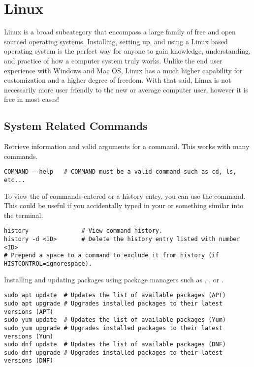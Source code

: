 \chapter{Linux}
\thispagestyle{fancy}
\lstset{language=Bash, style=terminalstyle}

Linux is a broad subcategory that encompass a large family of free and open sourced operating systems. Installing, setting up, and using a Linux based operating system is the perfect way for anyone to gain knowledge, understanding, and practice of how a computer system truly works. Unlike the end user experience with Windows and Mac OS, Linux has a much higher capability for customization and a higher degree of freedom. With that said, Linux is not necessarily more user friendly to the new or average computer user, however it is free in most cases!








\section{System Related Commands}

Retrieve information and valid arguments for a command. This works with many commands.
\begin{lstlisting}
COMMAND --help   # COMMAND must be a valid command such as cd, ls, etc...
\end{lstlisting}

To view the  of commands entered or  a history entry, you can use the  command. This could be useful if you accidentally typed in your  or something similar into the terminal.
\begin{lstlisting}
history               # View command history.
history -d <ID>       # Delete the history entry listed with number <ID>
# Prepend a space to a command to exclude it from history (if HISTCONTROL=ignorespace).
\end{lstlisting}

Installing and updating packages using package managers such as , , or .
\begin{lstlisting}
sudo apt update  # Updates the list of available packages (APT)
sudo apt upgrade # Upgrades installed packages to their latest versions (APT)
sudo yum update  # Updates the list of available packages (Yum)
sudo yum upgrade # Upgrades installed packages to their latest versions (Yum)
sudo dnf update  # Updates the list of available packages (DNF)
sudo dnf upgrade # Upgrades installed packages to their latest versions (DNF)
\end{lstlisting}

